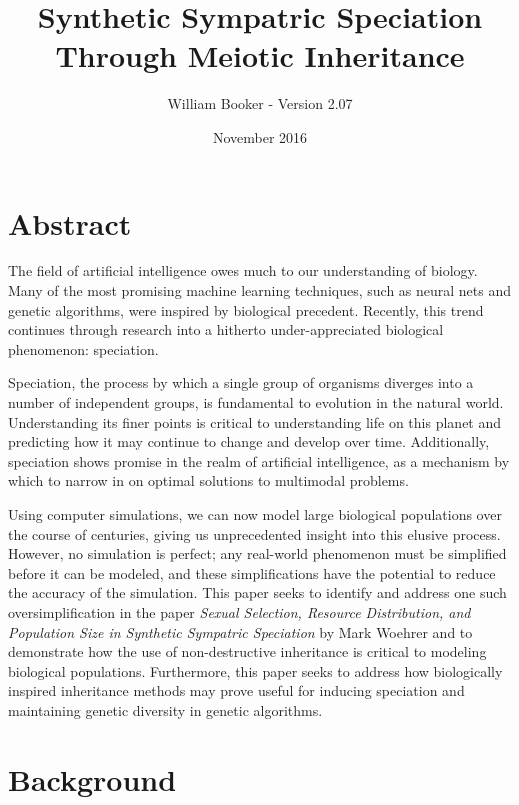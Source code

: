 \documentclass{article}
\title{Synthetic Sympatric Speciation Through Meiotic Inheritance}
\author{William Booker - Version 2.07}
\date{November 2016}
\newcommand\TODO[1]{\textcolor{red}{#1}}
\begin{document}
\maketitle


\section{Abstract}

The field of artificial intelligence owes much to our understanding of biology. Many of the most promising machine learning techniques, such as neural nets and genetic algorithms, were inspired by biological precedent. Recently, this trend continues through research into a hitherto under-appreciated biological phenomenon: speciation.

Speciation, the process by which a single group of organisms diverges into a number of independent groups, is fundamental to evolution in the natural world. Understanding its finer points is critical to understanding life on this planet and predicting how it may continue to change and develop over time. Additionally, speciation shows promise in the realm of artificial intelligence, as a mechanism by which to narrow in on optimal solutions to multimodal problems.

Using computer simulations, we can now model large biological populations over the course of centuries, giving us unprecedented insight into this elusive process. However, no simulation is perfect; any real-world phenomenon must be simplified before it can be modeled, and these simplifications have the potential to reduce the accuracy of the simulation. This paper seeks to identify and address one such oversimplification in the paper \textit{Sexual Selection, Resource Distribution, and Population Size in Synthetic Sympatric Speciation} by Mark Woehrer and  to demonstrate how the use of non-destructive inheritance is critical to modeling biological populations. Furthermore, this paper seeks to address how biologically inspired inheritance methods may prove useful for inducing speciation and maintaining genetic diversity in genetic algorithms.



\section{Background}
\end{document}
